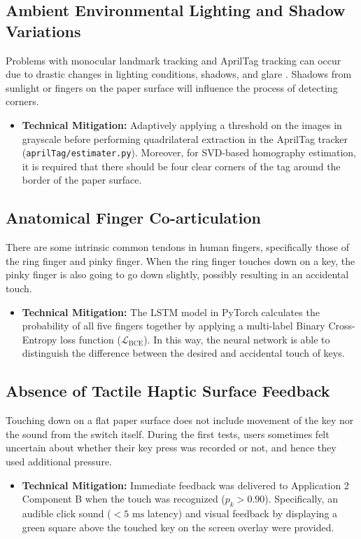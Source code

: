 \subsection{Ambient Environmental Lighting and Shadow Variations}
Problems with monocular landmark tracking and AprilTag tracking can occur due to drastic changes in lighting conditions, shadows, and glare \cite{ReviewVirtualKeyboard2020}. Shadows from sunlight or fingers on the paper surface will influence the process of detecting corners.
\begin{itemize}
    \item \textbf{Technical Mitigation:} Adaptively applying a threshold on the images in grayscale before performing quadrilateral extraction in the AprilTag tracker (\texttt{aprilTag/estimater.py}). Moreover, for SVD-based homography estimation, it is required that there should be four clear corners of the tag around the border of the paper surface.
\end{itemize}

\subsection{Anatomical Finger Co-articulation}
There are some intrinsic common tendons in human fingers, specifically those of the ring finger and pinky finger. When the ring finger touches down on a key, the pinky finger is also going to go down slightly, possibly resulting in an accidental touch.
\begin{itemize}
    \item \textbf{Technical Mitigation:} The LSTM model in PyTorch calculates the probability of all five fingers together by applying a multi-label Binary Cross-Entropy loss function ($\mathcal{L}_{\text{BCE}}$). In this way, the neural network is able to distinguish the difference between the desired and accidental touch of keys.
\end{itemize}

\subsection{Absence of Tactile Haptic Surface Feedback}
Touching down on a flat paper surface does not include movement of the key nor the sound from the switch itself. During the first tests, users sometimes felt uncertain about whether their key press was recorded or not, and hence they used additional pressure.
\begin{itemize}
    \item \textbf{Technical Mitigation:} Immediate feedback was delivered to Application 2 Component B when the touch was recognized ($p_k > 0.90$). Specifically, an audible click sound ($< 5\text{ ms}$ latency) and visual feedback by displaying a green square above the touched key on the screen overlay were provided.
\end{itemize}


